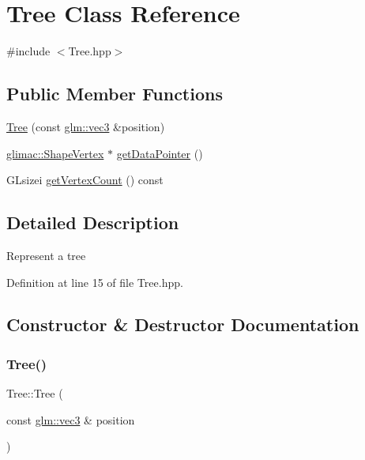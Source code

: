 \hypertarget{class_tree}{}\section{Tree Class Reference}
\label{class_tree}


{\ttfamily \#include $<$Tree.\+hpp$>$}

\subsection*{Public Member Functions}
\begin{DoxyCompactItemize}
\item 
\hyperlink{class_tree_aaf5d5749c1c566ec6800d66a135ba4b5}{Tree} (const \hyperlink{group__core__types_ga1c47e8b3386109bc992b6c48e91b0be7}{glm\+::vec3} \&position)
\item 
\hyperlink{structglimac_1_1_shape_vertex}{glimac\+::\+Shape\+Vertex} $\ast$ \hyperlink{class_tree_a237b223e9f1d85d144e17094b62d2fdf}{get\+Data\+Pointer} ()
\item 
G\+Lsizei \hyperlink{class_tree_aa23fb35f512dc74807ef7190eebb5a88}{get\+Vertex\+Count} () const
\end{DoxyCompactItemize}


\subsection{Detailed Description}
Represent a tree 

Definition at line 15 of file Tree.\+hpp.



\subsection{Constructor \& Destructor Documentation}
\mbox{\label{class_tree_aaf5d5749c1c566ec6800d66a135ba4b5}} 
\subsubsection{\texorpdfstring{Tree()}{Tree()}}
{\footnotesize\ttfamily Tree\+::\+Tree (\begin{DoxyParamCaption}\item[{const \hyperlink{group__core__types_ga1c47e8b3386109bc992b6c48e91b0be7}{glm\+::vec3} \&}]{position }\end{DoxyParamCaption})\hspace{0.3cm}{\ttfamily [explicit]}}

